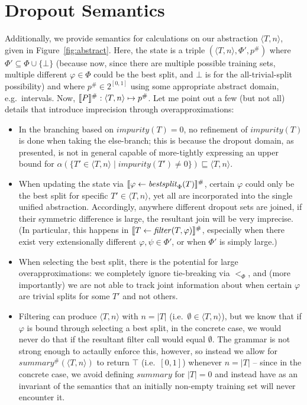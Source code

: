 \section{Dropout Semantics}

Additionally, we provide semantics for calculations on our abstraction $\langle T, n \rangle$,
given in Figure~\ref{fig:abstract}.
Here, the state is a triple $(\langle T, n \rangle, \Phi', p^\#)$
where $\Phi' \subseteq \Phi \cup \{\bot\}$
(because now, since there are multiple possible training sets,
multiple different $\varphi \in \Phi$ could be the best split,
and $\bot$ is for the all-trivial-split possibility)
and where $p^\# \in 2^{[0,1]}$
using some appropriate abstract domain, e.g.\ intervals.
Now, $\den{P}^\# : \langle T, n \rangle \mapsto p^\#$.
Let me point out a few (but not all) details
that introduce imprecision through overapproximations:
\begin{itemize}
    \item In the branching based on $\mathit{impurity}(T) = 0$,
        no refinement of $\mathit{impurity}(T)$ is done when taking the else-branch;
        this is because the dropout domain, as presented,
        is not in general capable of more-tightly expressing an upper bound for
        $\alpha(\{T' \in \langle T, n \rangle \mid \mathit{impurity}(T') \neq 0\})
        \sqsubseteq \langle T, n \rangle$.
    \item When updating the state via
        $\den{\varphi \gets \mathit{bestsplit}_\Phi(T)}^\#$,
        certain $\varphi$ could only be the best split for specific $T' \in \langle T, n \rangle$,
        yet all are incorporated into the single unified abstraction.
        Accordingly, anywhere different dropout sets are joined,
        if their symmetric difference is large, the resultant join
        will be very imprecise.
        (In particular, this happens in $\den{T \gets \mathit{filter}(T, \varphi)}^\#$,
        especially when there exist very extensionally different $\varphi, \psi \in \Phi'$,
        or when $\Phi'$ is simply large.)
    \item When selecting the best split, there is the potential for large overapproximations:
        \rone we completely ignore tie-breaking via $<_\Phi$, and (more importantly)
        \rtwo we are not able to track joint information about when certain $\varphi$
        are trivial splits for some $T'$ and not others.
    \item Filtering can produce $\langle T, n \rangle$ with $n = |T|$ (i.e.\ $\emptyset \in \langle T, n \rangle$),
        but we know that if $\varphi$ is bound through selecting a best split,
        in the concrete case, we would never do that if the resultant filter call would equal $\emptyset$.
        The grammar is not strong enough to actaully enforce this, however,
        so instead we allow for $\mathit{summary^\#}(\langle T, n \rangle)$
        to return $\top$ (i.e.\ $[0, 1]$) whenever $n = |T|$ --
        since in the concrete case, we avoid defining $\mathit{summary}$ for $|T| = 0$
        and instead have as an invariant of the semantics that an initially non-empty training set
        will never encounter it.
\end{itemize}

